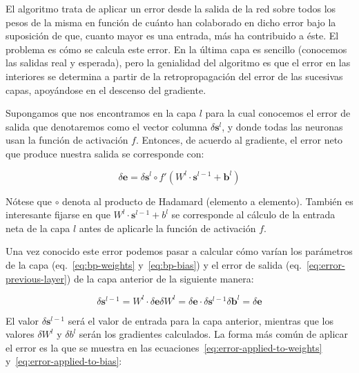 El algoritmo trata de aplicar un error desde la salida de la red sobre todos los pesos de la misma en función de cuánto han colaborado en dicho error bajo la suposición de que, cuanto mayor es una entrada, más ha contribuido a éste. El problema es cómo se calcula este error. En la última capa es sencillo (conocemos las salidas real y esperada), pero la genialidad del algoritmo es que el error en las interiores se determina a partir de la retropropagación del error de las sucesivas capas, apoyándose en el descenso del gradiente.

Supongamos que nos encontramos en la capa $l$ para la cual conocemos el error de salida que denotaremos como el vector columna $\delta \mathbf{s}^l$, y donde todas las neuronas usan la función de activación $f$. Entonces, de acuerdo al gradiente, el error neto que produce nuestra salida se corresponde con:

\begin{equation}
	\delta \mathbf{e} = \delta \mathbf{s}^l \circ f'(W^l \cdot \mathbf{s}^{l-1} + \mathbf{b}^l)
\end{equation}

Nótese que $\circ$ denota al producto de Hadamard (elemento a elemento). También es interesante fijarse en que $W^l \cdot \mathbf{s}^{l-1} + b^l$ se corresponde al cálculo de la entrada neta de la capa $l$ antes de aplicarle la función de activación $f$.

Una vez conocido este error podemos pasar a calcular cómo varían los parámetros de la capa (eq.~\ref{eq:bp-weights} y~\ref{eq:bp-bias}) y el error de salida (eq.~\ref{eq:error-previous-layer}) de la capa anterior de la siguiente manera:

\begin{subequations}
	\begin{equation}
		\delta \mathbf{s}^{l-1} = W^{l} \cdot \delta \mathbf{e} \label{eq:error-previous-layer}
	\end{equation}
	\begin{equation}
		\delta W^l = \delta \mathbf{e} \cdot \delta \mathbf{s}^{l-1} \label{eq:bp-weights}
	\end{equation}
	\begin{equation}
		\delta \mathbf{b}^l = \delta \mathbf{e} \label{eq:bp-bias}
	\end{equation}
\end{subequations}

El valor $\delta \mathbf{s}^{l-1}$ será el valor de entrada para la capa anterior, mientras que los valores $\delta W^l$ y $\delta b^l$ serán los gradientes calculados. La forma más común de aplicar el error es la que se muestra en las ecuaciones~\ref{eq:error-applied-to-weights} y~\ref{eq:error-applied-to-bias}:

